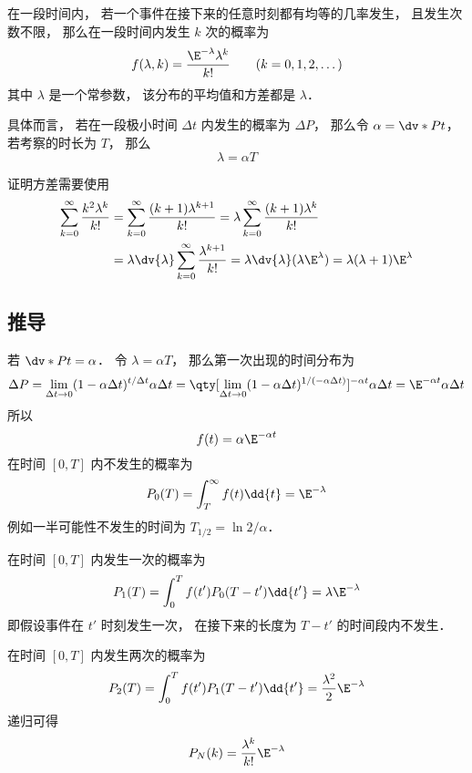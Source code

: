 
\begin{issues}
\issueDraft
\end{issues}

在一段时间内， 若一个事件在接下来的任意时刻都有均等的几率发生， 且发生次数不限， 那么在一段时间内发生 $k$ 次的概率为
\begin{equation}
f(\lambda, k) = \frac{\E^{-\lambda}\lambda^k}{k!} \qquad (k = 0,1,2,\dots)
\end{equation}
其中 $\lambda$ 是一个常参数， 该分布的平均值和方差都是 $\lambda$．

具体而言， 若在一段极小时间 $\Delta t$ 内发生的概率为 $\Delta P$， 那么令 $\alpha = \dv*{P}{t}$， 若考察的时长为 $T$， 那么
\begin{equation}
\lambda = \alpha T
\end{equation}


证明方差需要使用
\begin{equation}
\begin{aligned}
\sum_{k=0}^\infty \frac{k^2\lambda^{k}}{k!}
&= \sum_{k=0}^\infty \frac{(k+1)\lambda^{k+1}}{k!}
= \lambda \sum_{k=0}^\infty \frac{(k+1)\lambda^k}{k!}\\
&= \lambda\dv{\lambda} \sum_{k=0}^\infty \frac{\lambda^{k+1}}{k!}
= \lambda \dv{\lambda} (\lambda \E^{\lambda})
= \lambda(\lambda+1)\E^{\lambda}
\end{aligned}
\end{equation}

\subsection{推导}
若 $\dv*{P}{t} = \alpha$． 令 $\lambda = \alpha T$， 那么第一次出现的时间分布为
\begin{equation}
\Delta P = \lim_{\Delta t\to 0}(1 - \alpha\Delta t)^{t/\Delta t} \alpha\Delta t
= \qty[\lim_{\Delta t\to 0}(1 - \alpha\Delta t)^{1/(-\alpha\Delta t)}]^{-\alpha t} \alpha\Delta t
= \E^{-\alpha t} \alpha \Delta t
\end{equation}
所以
\begin{equation}
f(t) = \alpha\E^{-\alpha t}
\end{equation}
在时间 $[0,T]$ 内不发生的概率为
\begin{equation}
P_0(T) = \int_{T}^\infty f(t) \dd{t} = \E^{-\lambda}
\end{equation}
例如一半可能性不发生的时间为 $T_{1/2} = \ln 2/\alpha$．

在时间 $[0,T]$ 内发生一次的概率为
\begin{equation}
P_1(T) = \int_{0}^{T} f(t') P_0(T-t')\dd{t'} = \lambda \E^{-\lambda}
\end{equation}
即假设事件在 $t'$ 时刻发生一次， 在接下来的长度为 $T-t'$ 的时间段内不发生．

在时间 $[0,T]$ 内发生两次的概率为
\begin{equation}
P_2(T) = \int_{0}^{T} f(t') P_1(T-t')\dd{t'} = \frac{\lambda^2}{2}\E^{-\lambda}
\end{equation}
递归可得
\begin{equation}
P_N(k) = \frac{\lambda^k}{k!}\E^{-\lambda}
\end{equation}
